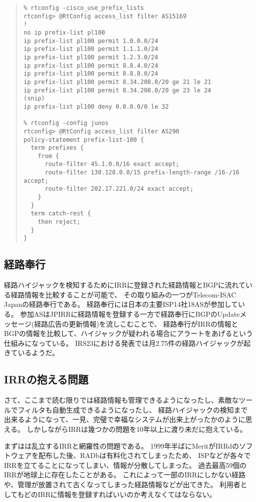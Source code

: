 \begin{quote}
\begin{minilinespace}
\begin{verbatim}
% rtconfig -cisco_use_prefix_lists
rtconfig> @RtConfig access_list filter AS15169
!
no ip prefix-list pl100
ip prefix-list pl100 permit 1.0.0.0/24
ip prefix-list pl100 permit 1.1.1.0/24
ip prefix-list pl100 permit 1.2.3.0/24
ip prefix-list pl100 permit 8.8.4.0/24
ip prefix-list pl100 permit 8.8.8.0/24
ip prefix-list pl100 permit 8.34.208.0/20 ge 21 le 21
ip prefix-list pl100 permit 8.34.208.0/20 ge 23 le 24
(snip)
ip prefix-list pl100 deny 0.0.0.0/0 le 32

% rtconfig -config junos
rtconfig> @RtConfig access_list filter AS290
policy-statement prefix-list-100 {
  term prefixes {
    from {
      route-filter 45.1.0.0/16 exact accept;
      route-filter 130.128.0.0/15 prefix-length-range /16-/16 accept;
      route-filter 202.17.221.0/24 exact accept;
    }
  }
  term catch-rest {
    then reject;
  }
}
\end{verbatim}
\end{minilinespace}
\end{quote}


\subsection{経路奉行}

経路ハイジャックを検知するためにIRRに登録された経路情報とBGPに流れている経路情報を比較することが可能で、
その取り組みの一つがTelecom-ISAC Japanの経路奉行である。
経路奉行には日本の主要ISP14社18ASが参加している。
参加ASはJPIRRに経路情報を登録する一方で経路奉行にBGPのUpdateメッセージ(経路広告の更新情報)を流しこむことで、
経路奉行がIRRの情報とBGPの情報を比較して、ハイジャックが疑われる場合にアラートをあげるという仕組みになっている。
IRS23における発表では月2.75件の経路ハイジャックが起きているようだ。

\subsection{IRRの抱える問題}

さて、ここまで読む限りでは経路情報も管理できるようになったし、素敵なツールでフィルタも自動生成できるようになったし、
経路ハイジャックの検知まで出来るようになって、一見、完璧で幸福なシステムが出来上がったかのように思える。
しかしながらIRRは幾つかの問題を10年以上に渡り未だに抱えている。

まずはは乱立するIRRと網羅性の問題である。
1999年半ばにMeritがIRRdのソフトウェアを配布した後、RADbは有料化されてしまったため、
ISPなどが各々でIRRを立てることになってしまい、情報が分散してしまった。
過去最高59個のIRRが地球上に存在したことがある。
これによって一部のIRRにしかない経路や、管理が放置されて古くなってしまった経路情報などが出てきた。
利用者としてもどのIRRに情報を登録すればいいのか考えなくてはならない。

